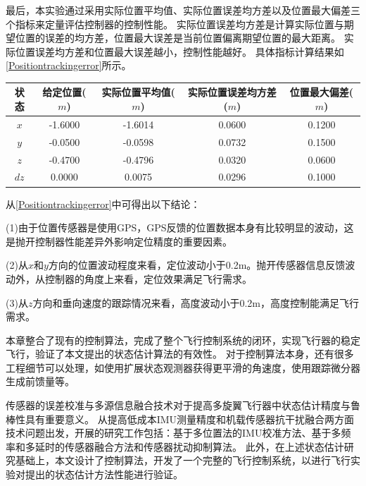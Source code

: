 \documentclass[
  type=master
]{gdutthesis}
\begin{document}
最后，本实验通过采用实际位置平均值、实际位置误差均方差以及位置最大偏差三个指标来定量评估控制器的控制性能。
实际位置误差均方差是计算实际位置与期望位置的误差的均方差，位置最大误差是当前位置偏离期望位置的最大距离。
实际位置误差均方差和位置最大误差越小，控制性能越好。
具体指标计算结果如\autoref{Positiontrackingerror}所示。
\begin{table}[H]
	\label{Positiontrackingerror}
	\begin{tabular}{ccccc}
		\toprule
		状态 & 给定位置($m$) & 实际位置平均值($m$) & 实际位置误差均方差($m$) & 位置最大偏差($m$)\\
		\midrule
		$x$ & -1.6000 & -1.6014 & 0.0600 & 0.1200 \\ 
		$y$ & -0.0500 & -0.0598 & 0.0732 & 0.1500 \\
		$z$ & -0.4700 & -0.4796 & 0.0320 & 0.0600 \\
		$dz$ & 0.0000 & 0.0075 & 0.0296 & 0.1000 \\
		\bottomrule 
	\end{tabular}
\end{table}

从\autoref{Positiontrackingerror}中可得出以下结论：

(1)由于位置传感器是使用GPS，GPS反馈的位置数据本身有比较明显的波动，这是抛开控制器性能差异外影响定位精度的重要因素。

(2)从$x$和$y$方向的位置波动程度来看，定位波动小于0.2m。抛开传感器信息反馈波动外，从控制器的角度上来看，定位效果满足飞行需求。

(3)从$z$方向和垂向速度的跟踪情况来看，高度波动小于0.2m，高度控制能满足飞行需求。

本章整合了现有的控制算法，完成了整个飞行控制系统的闭环，实现飞行器的稳定飞行，验证了本文提出的状态估计算法的有效性。
对于控制算法本身，还有很多工程细节可以处理，如使用扩展状态观测器获得更平滑的角速度，使用跟踪微分器生成前馈量等。

\gdutbackmatter
{}
传感器的误差校准与多源信息融合技术对于提高多旋翼飞行器中状态估计精度与鲁棒性具有重要意义。
从提高低成本IMU测量精度和机载传感器抗干扰融合两方面技术问题出发，开展的研究工作包括：基于多位置法的IMU校准方法、基于多频率和多延时的传感器融合方法和传感器扰动抑制算法。
此外，在上述状态估计研究基础上，本文设计了控制算法，开发了一个完整的飞行控制系统，以进行飞行实验对提出的状态估计方法性能进行验证。
\end{document}
